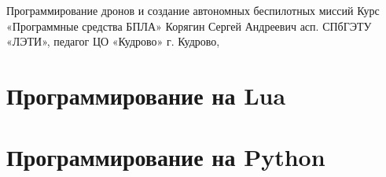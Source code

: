 \documentclass[
    fontsize=11pt,
    parskip=half,
    headings=big,
    numbers=noenddot,
    toc=listof,
    toc=bib,
    headinclude=true,
    footinclude=false
]{scrartcl}
\begin{document}
\makePioneerTitle
    {Программирование дронов и создание автономных беспилотных миссий}
    {Курс «Программные средства БПЛА»}
    {Корягин Сергей Андреевич}
    {асп. СПбГЭТУ «ЛЭТИ», педагог ЦО «Кудрово»}
    {г. Кудрово, \the\year}


\rmfamily

\tableofcontents
\clearpage


\clearpage






\clearpage

\part{Программирование на Lua}









\clearpage







\clearpage









\clearpage

\part{Программирование на Python}
\end{document}
